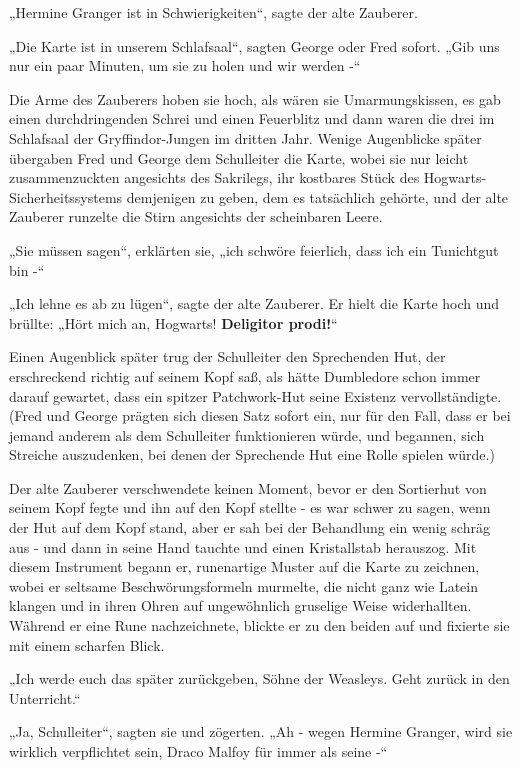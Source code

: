 {„Hermine Granger ist in Schwierigkeiten“, sagte der alte Zauberer.

„Die Karte ist in unserem Schlafsaal“, sagten George oder Fred sofort. „Gib uns nur ein paar Minuten, um sie zu holen und wir werden -“

Die Arme des Zauberers hoben sie hoch, als wären sie Umarmungskissen, es gab einen durchdringenden Schrei und einen Feuerblitz und dann waren die drei im Schlafsaal der Gryffindor-Jungen im dritten Jahr. Wenige Augenblicke später übergaben Fred und George dem Schulleiter die Karte, wobei sie nur leicht zusammenzuckten angesichts des Sakrilegs, ihr kostbares Stück des Hogwarts-Sicherheitssystems demjenigen zu geben, dem es tatsächlich gehörte, und der alte Zauberer runzelte die Stirn angesichts der scheinbaren Leere.

„Sie müssen sagen“, erklärten sie, „ich schwöre feierlich, dass ich ein Tunichtgut bin -“

„Ich lehne es ab zu lügen“, sagte der alte Zauberer. Er hielt die Karte hoch und brüllte: „Hört mich an, Hogwarts! \textbf{Deligitor prodi!}“

Einen Augenblick später trug der Schulleiter den Sprechenden Hut, der erschreckend richtig auf seinem Kopf saß, als hätte Dumbledore schon immer darauf gewartet, dass ein spitzer Patchwork-Hut seine Existenz vervollständigte. (Fred und George prägten sich diesen Satz sofort ein, nur für den Fall, dass er bei jemand anderem als dem Schulleiter funktionieren würde, und begannen, sich Streiche auszudenken, bei denen der Sprechende Hut eine Rolle spielen würde.)

Der alte Zauberer verschwendete keinen Moment, bevor er den Sortierhut von seinem Kopf fegte und ihn auf den Kopf stellte - es war schwer zu sagen, wenn der Hut auf dem Kopf stand, aber er sah bei der Behandlung ein wenig schräg aus - und dann in seine Hand tauchte und einen Kristallstab herauszog. Mit diesem Instrument begann er, runenartige Muster auf die Karte zu zeichnen, wobei er seltsame Beschwörungsformeln murmelte, die nicht ganz wie Latein klangen und in ihren Ohren auf ungewöhnlich gruselige Weise widerhallten. Während er eine Rune nachzeichnete, blickte er zu den beiden auf und fixierte sie mit einem scharfen Blick.

„Ich werde euch das später zurückgeben, Söhne der Weasleys. Geht zurück in den Unterricht.“

„Ja, Schulleiter“, sagten sie und zögerten. „Ah - wegen Hermine Granger, wird sie wirklich verpflichtet sein, Draco Malfoy für immer als seine -“

}
